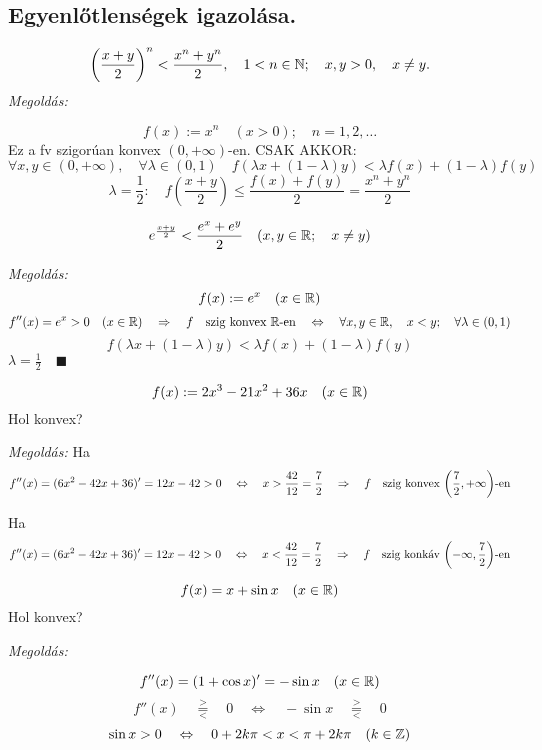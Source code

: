 \documentclass[a4paper,11.5pt]{article}
\begin{document}
	\subsection{Egyenlőtlenségek igazolása.}
	\begin{task}
		\[ \left(\frac{x+y}{2}\right)^n<\frac{x^n+y^n}{2},\quad 1<n\in\mathbb{N};\quad x,y>0,\quad x\not=y. \]
		\textit{Megoldás:}
		
		\[ f(x):=x^n\quad (x>0);\quad n=1,2,\ldots \]
		Ez a fv szigorúan konvex $(0,+\infty)$-en. CSAK AKKOR:
		\[ \forall x,y\in(0,+\infty),\quad \forall\lambda\in(0,1)\quad f(\lambda x+(1-\lambda)y)<\lambda f(x)+(1-\lambda)f(y) \]
		\[ \lambda= \frac{1}{2}:\quad f\left(\frac{x+y}{2}\right)\leq\frac{f(x)+f(y)}{2}=\frac{x^n+y^n}{2} \]
	\end{task}
	\begin{task}
		\[ e^{\frac{x+y}{2}}<\frac{e^x+e^y}{2}\quad (x,y\in\mathbb{R};\quad x\not=y) \]
		
		\textit{Megoldás:}
		\[ f(x):=e^x\quad (x\in\mathbb{R}) \]
		\[ f''(x)=e^x>0\quad (x\in\mathbb{R})\quad \Rightarrow\quad f\quad \text{szig konvex $\mathbb{R}$-en}\quad \Leftrightarrow\quad \forall x,y\in\mathbb{R},\quad x<y;\quad \forall \lambda\in(0,1) \]
		\[ f(\lambda x+(1-\lambda)y)<\lambda f(x)+(1-\lambda)f(y) \]
		$\lambda=\frac{1}{2}\quad \blacksquare$
	\end{task}
	\begin{task}
		\[ f(x):=2x^3-21x^2+36x\quad (x\in\mathbb{R}) \]
		Hol konvex?
		
		\textit{Megoldás:} Ha 
		\[ f''(x)=(6x^2-42x+36)'=12x-42>0\quad \Leftrightarrow\quad x>\frac{42}{12}=\frac{7}{2}\quad \Rightarrow\quad f \text{\quad szig konvex $\left(\frac{7}{2},+\infty\right)$-en} \]
		
		Ha 
		\[ f''(x)=(6x^2-42x+36)'=12x-42>0\quad \Leftrightarrow\quad x<\frac{42}{12}=\frac{7}{2}\quad \Rightarrow\quad f \text{\quad szig konkáv $\left(-\infty,\frac{7}{2}\right)$-en} \]
	\end{task}
	\begin{task}
		\[ f(x)=x+\sin x\quad (x\in\mathbb{R}) \]
		Hol konvex?
		
		\textit{Megoldás:}
		
		\[ f''(x)=(1+\cos x)'=-\sin x\quad (x\in\mathbb{R}) \]
		\[ f''(x)\quad \overset{>}{\underset{<}{=}}\quad 0\quad \Leftrightarrow\quad -\sin x \quad \overset{>}{\underset{<}{=}}\quad 0  \]
		\[ \sin x >0\quad \Leftrightarrow\quad 0+2k\pi<x<\pi+2k\pi\quad (k\in\mathbb{Z}) \]
	\end{task}
\end{document}
